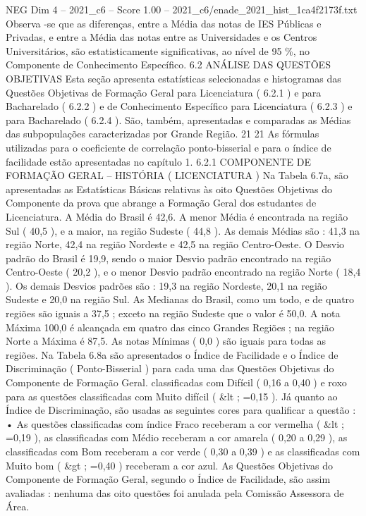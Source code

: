 \begin{textsample}{NEG Dim 4 – 2021\_c6 – Score 1.00 – 2021\_c6/enade\_2021\_hist\_1ca4f2173f.txt}
Observa -se que as diferenças, entre a Média das notas de IES Públicas e Privadas, e entre a Média das notas entre as Universidades e os Centros Universitários, são estatisticamente significativas, ao nível de 95 \%, no Componente de Conhecimento Específico. 6.2 ANÁLISE DAS QUESTÕES OBJETIVAS Esta seção apresenta estatísticas selecionadas e histogramas das Questões Objetivas de Formação Geral para Licenciatura ( 6.2.1 ) e para Bacharelado ( 6.2.2 ) e de Conhecimento Específico para Licenciatura ( 6.2.3 ) e para Bacharelado ( 6.2.4 ).
São, também, apresentadas e comparadas as Médias das subpopulações caracterizadas por Grande Região. 21 21 As fórmulas utilizadas para o coeficiente de correlação ponto-bisserial e para o índice de facilidade estão apresentadas no capítulo 1. 6.2.1 COMPONENTE DE FORMAÇÃO GERAL – HISTÓRIA ( LICENCIATURA ) Na Tabela 6.7a, são apresentadas as Estatísticas Básicas relativas às oito Questões Objetivas do Componente da prova que abrange a Formação Geral dos estudantes de Licenciatura.
A Média do Brasil é 42,6.
A menor Média é encontrada na região Sul ( 40,5 ), e a maior, na região Sudeste ( 44,8 ).
As demais Médias são : 41,3 na região Norte, 42,4 na região Nordeste e 42,5 na região Centro-Oeste.
O Desvio padrão do Brasil é 19,9, sendo o maior Desvio padrão encontrado na região Centro-Oeste ( 20,2 ), e o menor Desvio padrão encontrado na região Norte ( 18,4 ).
Os demais Desvios padrões são : 19,3 na região Nordeste, 20,1 na região Sudeste e 20,0 na região Sul.
As Medianas do Brasil, como um todo, e de quatro regiões são iguais a 37,5 ; exceto na região Sudeste que o valor é 50,0.
A nota Máxima 100,0 é alcançada em quatro das cinco Grandes Regiões ; na região Norte a Máxima é 87,5.
As notas Mínimas ( 0,0 ) são iguais para todas as regiões.
Na Tabela 6.8a são apresentados o Índice de Facilidade e o Índice de Discriminação ( Ponto-Bisserial ) para cada uma das Questões Objetivas do Componente de Formação Geral. classificadas com Difícil ( 0,16 a 0,40 ) e roxo para as questões classificadas com Muito difícil ( \&lt ; =0,15 ).
Já quanto ao Índice de Discriminação, são usadas as seguintes cores para qualificar a questão : • As questões classificadas com índice Fraco receberam a cor vermelha ( \&lt ; =0,19 ), as classificadas com Médio receberam a cor amarela ( 0,20 a 0,29 ), as classificadas com Bom receberam a cor verde ( 0,30 a 0,39 ) e as classificadas com Muito bom ( \&gt ; =0,40 ) receberam a cor azul.
As Questões Objetivas do Componente de Formação Geral, segundo o Índice de Facilidade, são assim avaliadas : nenhuma das oito questões foi anulada pela Comissão Assessora de Área.

\end{textsample}
